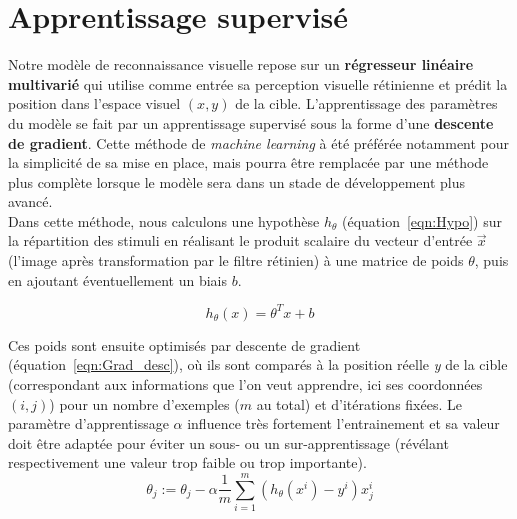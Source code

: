 
\section{Apprentissage supervisé} %

Notre modèle de reconnaissance visuelle repose sur un \textbf{régresseur linéaire multivarié} qui utilise comme entrée sa perception visuelle rétinienne et prédit la position dans l'espace visuel $(x,y)$ de la cible. L'apprentissage des paramètres du modèle se fait par un apprentissage supervisé sous la forme d'une \textbf{descente de gradient}. Cette méthode de \textit{machine learning} à été préférée notamment pour la simplicité de sa mise en place, mais pourra être remplacée par une méthode plus complète lorsque le modèle sera dans un stade de développement plus avancé.\\
Dans cette méthode, nous calculons une hypothèse $h_{\theta}$ (équation~\ref{eqn:Hypo}) sur la répartition des stimuli en réalisant le produit scalaire du vecteur d'entrée $\overrightarrow{x}$ (l'image après transformation par le filtre rétinien) à une matrice de poids $\theta$, puis en ajoutant éventuellement un biais $b$.

\begin{equation}
h_{\theta}(x) = \theta^{T}x + b
\label{eqn:Hypo}
\end{equation}

Ces poids sont ensuite optimisés par descente de gradient (équation~\ref{eqn:Grad_desc}), où ils sont comparés à la position réelle \textit{y} de la cible (correspondant aux informations que l'on veut apprendre, ici ses coordonnées $(i,j)$) pour un nombre d'exemples ($m$ au total) et d'itérations fixées. Le paramètre d'apprentissage $\alpha$ influence très fortement l'entrainement et sa valeur doit être adaptée pour éviter un sous- ou un sur-apprentissage (révélant respectivement une valeur trop faible ou trop importante).\\

\begin{equation}
\theta_j := \theta_j - \alpha \frac{1}{m} \sum_{i=1}^m (h_\theta(x^i) - y^i)x_{j}^i
\label{eqn:Grad_desc}
\end{equation}

